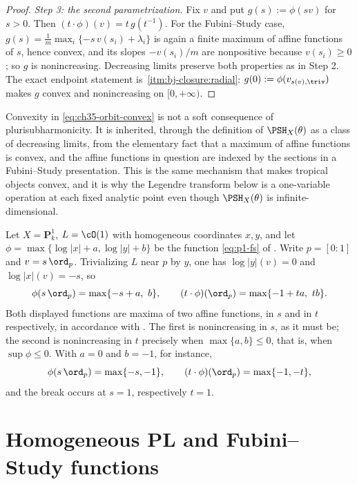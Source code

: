 \begin{proof}
\emph{Step 3: the second parametrization.}
Fix $v$ and put $g(s):=\phi(sv)$ for $s>0$.  Then
$(t\cdot\phi)(v)=t\,g(t^{-1})$.  For the Fubini--Study case,
$g(s)=\frac1m\max_i\{-s\,v(s_i)+\lambda_i\}$ is again a finite maximum of
affine functions of $s$, hence convex, and its slopes
$-v(s_i)/m$ are nonpositive because $v(s_i)\geq0$; so $g$ is
nonincreasing.  Decreasing limits preserve both properties as in Step 2.
The exact endpoint statement is
\,\cref{itm:bj-closure:radial}:
$g(0):=\phi(v_{s(v),\triv})$ makes $g$ convex and nonincreasing on
$[0,+\infty)$.
\end{proof}

\begin{remark}
\label{rem:ch35-convexity-source}
Convexity in \eqref{eq:ch35-orbit-convex} is not a soft consequence of
plurisubharmonicity.  It is inherited, through the definition of
$\PSH_X(\theta)$ as a class of decreasing limits, from the elementary fact
that a maximum of affine functions is convex, and the affine functions in
question are indexed by the sections in a Fubini--Study presentation.  This
is the same mechanism that makes tropical objects convex, and it is why the
Legendre transform below is a one-variable operation at
each fixed analytic point even though $\PSH_X(\theta)$ is
infinite-dimensional.
\end{remark}

\begin{example}
\label{ex:ch35-p1-orbit}
Let $X=\mathbf P^1_k$, $L=\cO(1)$ with homogeneous coordinates
$x,y$, and let
$\phi=\max\{\log|x|+a,\log|y|+b\}$ be the function
\eqref{eq:p1-fs} of .  Write $p=[0:1]$ and
$v=s\,\ord_p$.  Trivializing $L$ near $p$ by $y$, one has
$\log|y|(v)=0$ and $\log|x|(v)=-s$, so
\[
 \phi(s\,\ord_p)=\max\{-s+a,\ b\},
 \qquad
 (t\cdot\phi)(\ord_p)=\max\{-1+ta,\ tb\}.
\]
Both displayed functions are maxima of two affine functions, in $s$ and
in $t$ respectively, in accordance with
.  The first is nonincreasing in $s$, as it
must be; the second is nonincreasing in $t$ precisely when
$\max\{a,b\}\leq0$, that is, when $\sup\phi\leq0$.  With $a=0$ and
$b=-1$, for instance,
\[
 \phi(s\,\ord_p)=\max\{-s,-1\},
 \qquad
 (t\cdot\phi)(\ord_p)=\max\{-1,-t\},
\]
and the break occurs at $s=1$, respectively $t=1$.
\end{example}

\section{Homogeneous PL and Fubini--Study functions}
\label{sec:ch35-hom-pl-fs}

